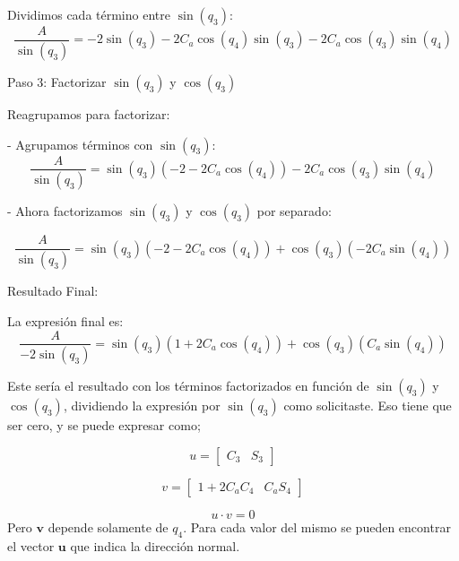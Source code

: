 \documentclass[a4paper,12pt]{article}
\begin{document}
Dividimos cada término entre \(\sin(q_3)\):
\[
\frac{A}{\sin(q_3)} = -2\sin(q_3) - 2C_a \cos(q_4)\sin(q_3) - 2C_a \cos(q_3)\sin(q_4)
\]

Paso 3: Factorizar \(\sin(q_3)\) y \(\cos(q_3)\)

Reagrupamos para factorizar:

- Agrupamos términos con \(\sin(q_3)\):
\[
\frac{A}{\sin(q_3)} = \sin(q_3)(-2 - 2C_a \cos(q_4)) - 2C_a \cos(q_3)\sin(q_4)
\]

- Ahora factorizamos \(\sin(q_3)\) y \(\cos(q_3)\) por separado:

\[
\frac{A}{\sin(q_3)} = \sin(q_3)(-2 - 2C_a \cos(q_4)) + \cos(q_3)(-2C_a \sin(q_4))
\]

Resultado Final:

La expresión final es:
\[
\frac{A}{-2\sin(q_3)} = \sin(q_3)(1 + 2C_a \cos(q_4)) + \cos(q_3)(C_a \sin(q_4))
\]

Este sería el resultado con los términos factorizados en función de \(\sin(q_3)\) y \(\cos(q_3)\), dividiendo la expresión por \(\sin(q_3)\) como solicitaste.
Eso tiene que ser cero, y se puede expresar como;

\begin{equation}
    u =
    \begin{bmatrix}
        C_3 & S_3
    \end{bmatrix}
\end{equation}

\begin{equation}
    v =
    \begin{bmatrix}
        1 + 2C_aC_4 & C_aS_4
    \end{bmatrix}
\end{equation}

\[u \cdot v = 0\]
Pero $\mathbf{v}$ depende solamente de $q_4$. Para cada valor del mismo
se pueden encontrar el vector $\mathbf{u}$ que indica la dirección normal.



\end{document}
